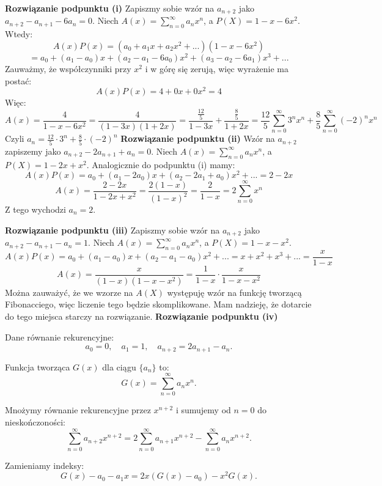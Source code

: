 \documentclass{mwart}
\begin{document}
\begin{mdframed}
    \textbf{Rozwiązanie podpunktu (i)}
    Zapiszmy sobie wzór na $a_{n+2}$ jako $a_{n+2} - a_{n+1} -6a_n=0$. Niech $A(x) = \sum_{n=0}^{\infty}a_nx^n$, a $P(X) = 1-x-6x^2$. Wtedy:
\[A(x)P(x) = (a_0 + a_1 x + a_2 x^2 + ...)(1-x-6x^2) \]
\[= a_0 +(a_1-a_0)x + (a_2-a_1-6a_0)x^2 + (a_3-a_2-6a_1)x^3 + ...\]
Zauważmy, że współczynniki przy $x^2$ i w górę się zerują, więc wyrażenie ma postać:
\[A(x)P(x) = 4+0x+0x^2 = 4\]
Więc:
\[A(x) = \frac{4}{1-x-6x^2} = \frac{4}{(1-3x)(1+2x)} = \frac{\frac{12}{5}}{1-3x} + \frac{\frac{8}{5}}{1+2x} = \frac{12}{5}\sum_{n=0}^{\infty}3^nx^n + \frac{8}{5}\sum_{n=0}^{\infty}(-2)^nx^n\]
Czyli $a_n=\frac{12}{5}\cdot3^n+\frac{8}{5}\cdot(-2)^n$\newline
\textbf{Rozwiązanie podpunktu (ii)}
Wzór na $a_{n+2}$ zapiszemy jako $a_{n+2} - 2a_{n+1} +a_n=0$. Niech $A(x) = \sum_{n=0}^{\infty}a_nx^n$, a $P(X) = 1-2x+x^2$. Analogicznie do podpunktu (i) mamy:
\[A(x)P(x) = a_0 + (a_1 -2a_0)x+(a_2-2a_1+a_0)x^2 + ... = 2-2x\]
\[A(x) = \frac{2-2x}{1-2x+x^2} = \frac{2(1-x)}{(1-x)^2} = \frac{2}{1-x} = 2\sum_{n=0}^{\infty}x^n\]
Z tego wychodzi $a_n=2$.\newline

\textbf{Rozwiązanie podpunktu (iii)}
Zapiszmy sobie wzór na $a_{n+2}$ jako $a_{n+2} - a_{n+1} -a_n=1$. Niech $A(x) = \sum_{n=0}^{\infty}a_nx^n$, a $P(X) = 1-x-x^2$.
\[A(x)P(x) = a_0  + (a_1-a_0)x + (a_2-a_1-a_0)x^2+... = x+x^2+x^3+...=\frac{x}{1-x}\]
\[A(x) = \frac{x}{(1-x)(1-x-x^2)} = \frac{1}{1-x}\cdot\frac{x}{1-x-x^2}\]
Można zauważyć, że we wzorze na $A(X)$ występuję wzór na funkcję tworzącą Fibonacciego, więc liczenie tego będzie skomplikowane. Mam nadzieję, że dotarcie do tego miejsca starczy na rozwiązanie.
    \textbf{Rozwiązanie podpunktu (iv)}

    Dane równanie rekurencyjne:
    \[
    a_0 = 0, \quad a_1 = 1, \quad a_{n+2} = 2a_{n+1} - a_n.
    \]

    Funkcja tworząca $G(x)$ dla ciągu $\{a_n\}$ to:
    \[
    G(x) = \sum_{n=0}^{\infty} a_n x^n.
    \]

    Mnożymy równanie rekurencyjne przez $x^{n+2}$ i sumujemy od $n=0$ do nieskończoności:
    \[
    \sum_{n=0}^{\infty} a_{n+2} x^{n+2} = 2 \sum_{n=0}^{\infty} a_{n+1} x^{n+2} - \sum_{n=0}^{\infty} a_n x^{n+2}.
    \]

    Zamieniamy indeksy:
    \[
    G(x) - a_0 - a_1 x = 2x (G(x) - a_0) - x^2 G(x).
    \]


\end{mdframed}
\end{document}
